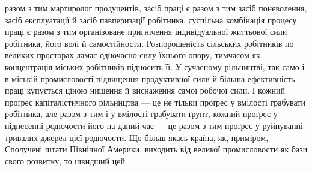 разом з тим мартиролог продуцентів, засіб праці є разом з тим
засіб поневолення, засіб експлуатації й засіб павперизації робітника,
суспільна комбінація процесу праці є разом з тим організоване
пригнічення індивідуальної життьової сили робітника,
його волі й самостійности. Розпорошеність сільських робітників
по великих просторах ламає одночасно силу їхнього
опору, тимчасом як концентрація міських робітників підносить
її. У сучасному рільництві, так само і в міській промисловості
підвищення продуктивної сили й більша ефективність праці
купується ціною нищення й виснаження самої робочої сили.
І кожний проґрес капіталістичного рільництва — це не тільки
проґрес у вмілості грабувати робітника, але разом з тим і у вмілості
грабувати ґрунт, кожний проґрес у піднесенні родючости
його на даний час — це разом з тим проґрес у руйнуванні тривалих
джерел цієї родючости. Що більш якась країна, як, приміром,
Сполучені штати Північної Америки, виходить від великої
промисловости як бази свого розвитку, то швидший цей
